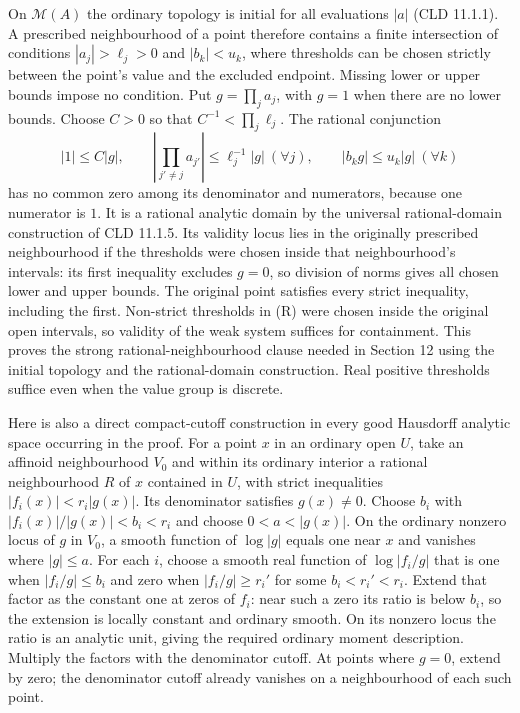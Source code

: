\documentclass[
  11pt,
]{article}
\begin{document}
On \(\mathcal M(A)\) the ordinary topology is initial for all
evaluations \(|a|\) (CLD 11.1.1). A prescribed neighbourhood of a point
therefore contains a finite intersection of conditions
\(|a_j|>\ell_j>0\) and \(|b_k|<u_k\), where thresholds can be chosen
strictly between the point's value and the excluded endpoint. Missing
lower or upper bounds impose no condition. Put \(g=\prod_j a_j\), with
\(g=1\) when there are no lower bounds. Choose \(C>0\) so that
\(C^{-1}<\prod_j\ell_j\). The rational conjunction \[
 |1|\le C|g|,\qquad
 |\prod_{j'\ne j}a_{j'}|\le\ell_j^{-1}|g|\ (\forall j),\qquad
 |b_kg|\le u_k|g|\ (\forall k)                         \tag{R}
\] has no common zero among its denominator and numerators, because one
numerator is \(1\). It is a rational analytic domain by the universal
rational-domain construction of CLD 11.1.5. Its validity locus lies in
the originally prescribed neighbourhood if the thresholds were chosen
inside that neighbourhood's intervals: its first inequality excludes
\(g=0\), so division of norms gives all chosen lower and upper bounds.
The original point satisfies every strict inequality, including the
first. Non-strict thresholds in (R) were chosen inside the original open
intervals, so validity of the weak system suffices for containment. This
proves the strong rational-neighbourhood clause needed in Section 12
using the initial topology and the rational-domain construction. Real
positive thresholds suffice even when the value group is discrete.

Here is also a direct compact-cutoff construction in every good
Hausdorff analytic space occurring in the proof. For a point \(x\) in an
ordinary open \(U\), take an affinoid neighbourhood \(V_0\) and within
its ordinary interior a rational neighbourhood \(R\) of \(x\) contained
in \(U\), with strict inequalities \(|f_i(x)|<r_i|g(x)|\). Its
denominator satisfies \(g(x)\ne0\). Choose \(b_i\) with
\(|f_i(x)|/|g(x)|<b_i<r_i\) and choose \(0<a<|g(x)|\). On the ordinary
nonzero locus of \(g\) in \(V_0\), a smooth function of \(\log|g|\)
equals one near \(x\) and vanishes where \(|g|\le a\). For each \(i\),
choose a smooth real function of \(\log|f_i/g|\) that is one when
\(|f_i/g|\le b_i\) and zero when \(|f_i/g|\ge r_i'\) for some
\(b_i<r_i'<r_i\). Extend that factor as the constant one at zeros of
\(f_i\): near such a zero its ratio is below \(b_i\), so the extension
is locally constant and ordinary smooth. On its nonzero locus the ratio
is an analytic unit, giving the required ordinary moment description.
Multiply the factors with the denominator cutoff. At points where
\(g=0\), extend by zero; the denominator cutoff already vanishes on a
neighbourhood of each such point.
\end{document}

